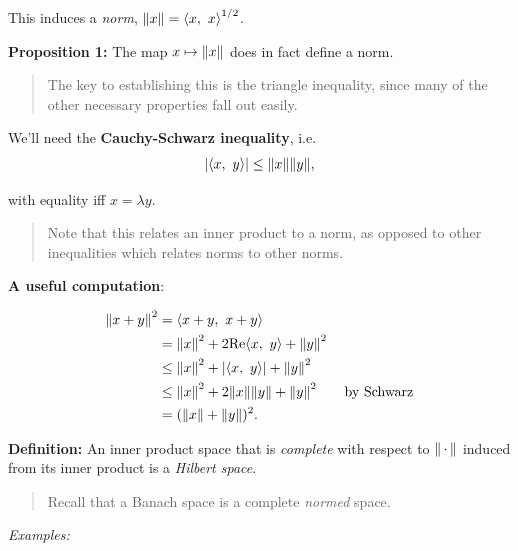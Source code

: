 This induces a \emph{norm}, \({\left\lVert {x} \right\rVert} = {\left\langle {x},~{x} \right\rangle}^{1/2}\).

\textbf{Proposition 1:} The map \(x \mapsto {\left\lVert {x} \right\rVert}\) does in fact
define a norm.

\begin{quote}
The key to establishing this is the triangle inequality, since many of
the other necessary properties fall out easily.
\end{quote}

We'll need the \textbf{Cauchy-Schwarz inequality}, i.e.
\begin{align*}
{\left\lvert {{\left\langle {x},~{y} \right\rangle}} \right\rvert} \leq {\left\lVert {x} \right\rVert} {\left\lVert {y} \right\rVert},
\end{align*}

with equality iff \(x = \lambda y\).

\begin{quote}
Note that this relates an inner product to a norm, as opposed to other
inequalities which relates norms to other norms.
\end{quote}

\textbf{A useful computation}:

\begin{align*}
{\left\lVert {x + y} \right\rVert}^2 
&= {\left\langle {x+y},~{x+y} \right\rangle} \\
&= {\left\lVert {x} \right\rVert}^2 + 2\mathrm{Re}{\left\langle {x},~{y} \right\rangle} + {\left\lVert {y} \right\rVert}^2 \\
&\leq {\left\lVert {x} \right\rVert}^2 + {\left\lvert {{\left\langle {x},~{y} \right\rangle}} \right\rvert} + {\left\lVert {y} \right\rVert}^2 \\
&\leq {\left\lVert {x} \right\rVert}^2 + 2{\left\lVert {x} \right\rVert}{\left\lVert {y} \right\rVert} + {\left\lVert {y} \right\rVert}^2 \quad\quad\text{by Schwarz} \\
&= ({\left\lVert {x} \right\rVert} + {\left\lVert {y} \right\rVert})^2
.\end{align*}

\textbf{Definition:} An inner product space that is \emph{complete} with
respect to \({\left\lVert {{\,\cdot\,}} \right\rVert}\) induced from its inner product is a
\emph{Hilbert space}.

\begin{quote}
Recall that a Banach space is a complete \emph{normed} space.
\end{quote}

\emph{Examples:}

